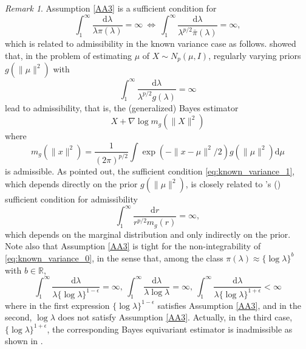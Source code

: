 \documentclass[preprint,11pt]{imsart}
\numberwithin{equation}{section}
\theoremstyle{plain}
\theoremstyle{definition}
\theoremstyle{remark}
\newtheorem{remark}{Remark}[section]
\def\citeapos#1{\citeauthor{#1}'s (\citeyear{#1})}
\newcommand{\rd}{\mathrm{d}}
\begin{document}
\begin{remark}
Assumption \ref{AA3} is a sufficient condition for
 \begin{equation}\label{eq:known_variance_0}
  \int_1^\infty \frac{\rd \lambda}{\lambda \pi(\lambda)}   =\infty \ 
   \Leftrightarrow \
   \int_1^\infty\frac   {\rd \lambda}{\lambda^{p/2} \bar{\pi}(\lambda)}=\infty,
 \end{equation}
 which is related to admissibility in the known variance case as follows.
 \cite{Maruyama-2009} showed that, in the problem of estimating $\mu$ of $X\sim N_p(\mu,I)$,
 regularly varying priors $ g(\|\mu\|^2)$ with
\begin{equation}\label{eq:known_variance_1}
 \int_1^\infty \frac{\rd \lambda}{\lambda^{p/2}g(\lambda)}=\infty
\end{equation}
 lead to admissibility, that is, the (generalized) Bayes estimator
       \begin{equation*}
X+\nabla \log m_g(\|X\|^2)
       \end{equation*}
 where
 \begin{equation}
  m_g(\|x\|^2)=\frac{1}{(2\pi)^{p/2}}\int \exp(-\|x-\mu\|^2/2)g(\|\mu\|^2)\rd \mu
 \end{equation}
 is admissible.
 As \cite{Maruyama-2009} pointed out, the sufficient condition \eqref{eq:known_variance_1},
 which depends directly on the prior $g(\|\mu\|^2)$, 
 is closely related to \citeapos{Brown-1971} sufficient condition for admissibility
 \begin{equation*}
   \int_1^\infty \frac{\rd r}{r^{p/2}m_g(r)}=\infty,
 \end{equation*}
which depends on the marginal distribution and only indirectly on the prior.
Note also that Assumption \ref{AA3} is tight for the non-integrability of \eqref{eq:known_variance_0}, in the
 sense that,
among the class $\pi(\lambda)\approx\{\log\lambda\}^b$ with $b\in\mathbb{R}$,
\begin{equation*}
  \int_1^\infty \frac{\rd \lambda}{\lambda \{\log\lambda\}^{1-\epsilon}}=\infty, \ 
  \int_1^\infty \frac{\rd \lambda}{\lambda \log\lambda}=\infty, \
  \int_1^\infty \frac{\rd \lambda}{\lambda \{\log\lambda\}^{1+\epsilon}}<\infty
\end{equation*}
 where in the first expression $\{\log\lambda\}^{1-\epsilon}$ satisfies  Assumption \ref{AA3},
 and in the second, $\log \lambda$ does not satisfy  Assumption \ref{AA3}.
 Actually, in the third case, $ \{\log\lambda\}^{1+\epsilon}$,
 the corresponding Bayes equivariant estimator is inadmissible as shown
 in \cite{Maruyama-Strawderman-2017}.
\end{remark}
\end{document}
